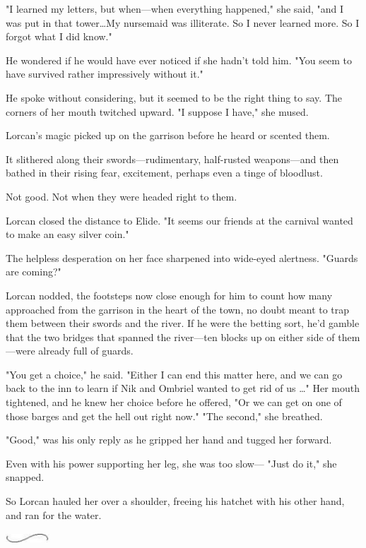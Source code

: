 "I learned my letters, but when---when everything happened," she said, "and I was put in that tower\ldots My nursemaid was illiterate.
So I never learned more.
So I forgot what I did know."

He wondered if he would have ever noticed if she hadn't told him.
"You seem to have survived rather impressively without it."

He spoke without considering, but it seemed to be the right thing to say.
The corners of her mouth twitched upward.
"I suppose I have," she mused.

Lorcan's magic picked up on the garrison before he heard or scented them.

It slithered along their swords---rudimentary, half-rusted weapons---and then bathed in their rising fear, excitement, perhaps even a tinge of bloodlust.

Not good.
Not when they were headed right to them.

Lorcan closed the distance to Elide.
"It seems our friends at the carnival wanted to make an easy silver coin."

The helpless desperation on her face sharpened into wide-eyed alertness.
"Guards are coming?"

Lorcan nodded, the footsteps now close enough for him to count how many approached from the garrison in the heart of the town, no doubt meant to trap them between their swords and the river.
If he were the betting sort, he'd gamble that the two bridges that spanned the river---ten blocks up on either side of them ---were already full of guards.

"You get a choice," he said.
"Either I can end this matter here, and we can go back to the inn to learn if Nik and Ombriel wanted to get rid of us \ldots" Her mouth tightened, and he knew her choice before he offered, "Or we can get on one of those barges and get the hell out right now."
"The second," she breathed.

"Good," was his only reply as he gripped her hand and tugged her forward.

Even with his power supporting her leg, she was too slow--- "Just do it," she snapped.

So Lorcan hauled her over a shoulder, freeing his hatchet with his other hand, and ran for the water.

\begin{center}
	\includegraphics[width=0.65in,height=0.13in]{images/seperator}
\end{center}

